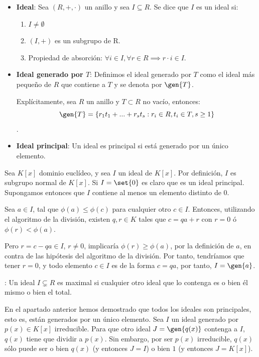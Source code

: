\begin{problem}
\spart


\begin{defToUse}
	\begin{itemize}
		\item \textbf{Ideal}: Sea $(R,+,\cdot)$ un anillo y sea $I \subseteq R$. Se dice que $I$ es un ideal si:
		\begin{enumerate}
			\item $I \neq \emptyset$
			\item $(I, +)$ es un subgrupo de R.
			\item Propiedad de absorción: $\forall i \in I, \forall r \in R \implies r\cdot i \in I$.
		\end{enumerate}
		\item \textbf{Ideal generado por $T$}: Definimos el ideal generado por $T$ como el ideal más pequeño de $R$ que contiene a $T$ y se denota por $\gen{T}$.

		Explícitamente, sea $R$ un anillo y $T \subset R$ no vacío, entonces:
		$$ \gen{T} = \{r_1t_1+...+r_st_s: r_i \in R, t_i \in T, s \geq 1 \} $$.
		\item \textbf{Ideal principal}: Un ideal es principal si está generado por un único elemento.
	\end{itemize}
\end{defToUse}

Sea $K[x]$ dominio euclídeo, y sea $I$ un ideal de $K[x]$. Por definición, $I$ es subgrupo normal de $K[x]$. Si $I=\set{0}$ es claro que es un ideal principal. Supongamos entonces que $I$ contiene al menos un elemento distinto de 0.

Sea $a \in I$, tal que $\phi(a) \leq \phi(c)$ para cualquier otro $c\in I$. Entonces, utilizando el algoritmo de la división, existen $q,r \in K$ tales que $c=qa+r$ con $r=0$ ó $\phi(r) < \phi(a)$.

Pero $r=c-qa \in I$, $r \neq 0$, implicaría $\phi(r) \geq \phi(a)$, por la definición de $a$, en contra de las hipótesis del algoritmo de la división. Por tanto, tendríamos que tener $r=0$, y todo elemento $c\in I$ es de la forma $c=qa$, por tanto, $I=\gen{a}$.

\spart


\begin{defToUse}
	: Un ideal $I \subsetneq R$ es maximal si cualquier otro ideal que lo contenga es o bien él mismo o bien el total.
\end{defToUse}


En el apartado anterior hemos demostrado que todos los ideales son principales, esto es, están generados por un único elemento. Sea $I$ un ideal generado por $p(x) ∈ K[x]$ irreducible. Para que otro ideal $J = \gen{q(x)}$ contenga a $I$, $q(x)$ tiene que dividir a $p(x)$. Sin embargo, por ser $p(x)$ irreducible, $q(x)$ sólo puede ser o bien $q(x)$ (y entonces $J = I$) o bien $1$ (y entonces $J = K[x]$).


\end{problem}
